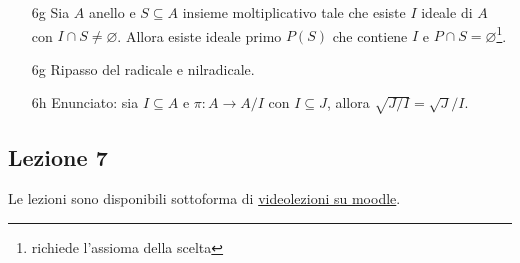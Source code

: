 \documentclass[italian]{article}
\begin{document}
\begin{enumerate}
      \item[6g] Sia $A$ anello e $S \subseteq A$ insieme moltiplicativo 
        tale che esiste $I$ ideale di $A$ con $I \cap S \neq \varnothing$. Allora esiste 
        ideale primo $P(S)$ che contiene $I$ e $P \cap
        S = \varnothing$\footnote{richiede l'assioma della scelta}. 
      \item[6g] Ripasso del radicale e nilradicale.
      \item[6h] Enunciato: sia $I \subseteq A$ e $\pi \colon A \to A / I$ con $I 
        \subseteq J$, allora $ = /I$.
    \end{enumerate}

    \subsection{Lezione 7}

    Le lezioni sono disponibili sottoforma di 
    \href{https://didatticaonline.unitn.it/dol/course/view.php?id=23268}{videolezioni
    su moodle}.
    
\end{document}
